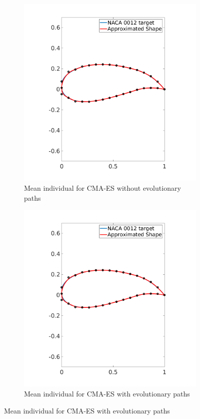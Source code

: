 \documentclass{article}
\begin{document}
\begin{itemize}
\begin{itemize}
\begin{figure}[http]
			\begin{subfigure}[b]{.50\linewidth}
				\includegraphics[scale=0.3]{img/CMA_ES_N_wing3_mean.png}
				\caption{Mean individual for CMA-ES without evolutionary paths}\label{fig:tiger}
			\end{subfigure}
			\hspace{2mm}
			\begin{subfigure}[b]{.45\linewidth}
				\includegraphics[scale = 0.3]{img/CMA_ES_wing3_mean.png}
				\caption{Mean individual for CMA-ES with evolutionary paths  \label{fig:xxx1}}
				

\end{subfigure}
\end{figure}
\end{itemize}
\end{itemize}
\end{document}

